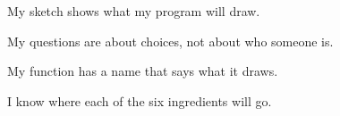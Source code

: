\begin{selfcheck}
  \item My sketch shows what my program will draw.
  \item My questions are about choices, not about who someone is.
  \item My function has a name that says what it draws.
  \item I know where each of the six ingredients will go.
\end{selfcheck}

